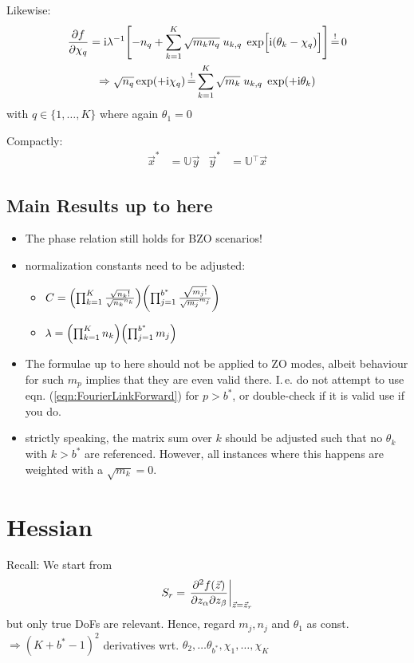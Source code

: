 \documentclass[
	english,
	a4paper,
	fontsize=10pt,
	parskip=half,
	titlepage=true,
	DIV=12,
	final
]{scrreprt}
\newcommand*{\Thus}{\ensuremath{\Rightarrow}\xspace}
\newcommand*{\transp}{\ensuremath{^\intercal}}
\newcommand*{\iunit}{\ensuremath{\mathrm{i}}}
\newcommand*{\equalCond}{  \mathop{=}\limits^!  }
\begin{document}
Likewise:
\begin{gather}
	\pdv{f}{\chi_q}
=
	\iunit\lambda^{-1}
	\qty[
		- n_q
		+
		\sum_{k=1}^{K}
			\sqrt{m_k n_q} \; u_{k,q} \; \exp[ \Big. \iunit(\theta_k - \chi_q) ]
	]
	\label{eqn:JacobianChi}
\equalCond
	0 \\
\Thus
	\sqrt{n_q} \exp(+\iunit \chi_q)
\equalCond
	\sum_{k=1}^{K}
	\sqrt{m_k} \; u_{k,q} \; \exp(+\iunit\theta_k)
	\label{eqn:FourierLinkBackward}
\end{gather}
with $q \in \{1, \ldots, K\}$ where again $\theta_1 = 0$

Compactly:
\begin{align}
	\vec{x}^{*} &= \mathbb{U} \vec{y}
&
	\vec{y}^{*} &= \mathbb{U}\transp \vec{x}
	\label{eqn:MatrixCondition}
\end{align}

\subsection{Main Results up to here}
\begin{itemize}
\item The phase relation still holds for BZO scenarios!
\item normalization constants need to be adjusted:
	\begin{itemize}
	\item $C =
	\qty( \prod_{k=1}^{K}
		\frac
			{ \sqrt{n_k!} }
			{ \sqrt{n_k}^{n_k} }
	)
	\qty( \prod_{j=1}^{b^*}
		\frac
			{ \sqrt{m_j!} }
			{ \sqrt{m_j}^{m_j} }
	)$
	\item $\lambda =
	\qty( \prod_{k=1}^{K}   n_k )
	\qty( \prod_{j=1}^{b^*} m_j )$
	\end{itemize}
\item The formulae up to here should not be applied to ZO modes, albeit behaviour for such $m_p$
	implies that they are even valid there. I.\,e. do not attempt to use eqn.
	(\ref{eqn:FourierLinkForward}) for $p > b^*$, or double-check if it is valid use if you do.
\item strictly speaking, the matrix sum over $k$ should be adjusted such that no $\theta_k$ with
	$k > b^*$ are referenced. However, all instances where this happens are weighted with a
	$\sqrt{m_k} = 0$.
\end{itemize}

\section{Hessian}
Recall: We start from
\begin{align}
	S_r
=
	\eval{
		\pdv{f(\vec{z})}%
			{z_\alpha}{z_\beta}
	}_{\vec{z} = \vec{z}_r}
\end{align}
but only true DoFs are relevant. Hence, regard $m_j, n_j$ and $\theta_1$ as const. \\
\Thus $(K + b^* - 1)^{2}$ derivatives wrt. $\theta_2, \ldots \theta_{b^*}, \chi_1, \ldots, \chi_K$
\end{document}
